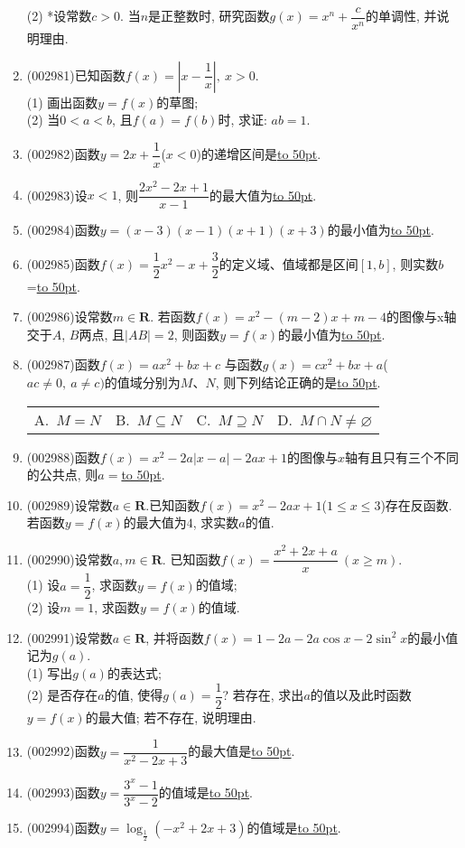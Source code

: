 \documentclass[10pt,a4paper]{article}
\newcommand{\blank}[1]{\underline{\hbox to #1pt{}}}
\newcommand{\fourch}[4]{\par\begin{tabular}{p{.23\textwidth}p{.23\textwidth}p{.23\textwidth}p{.23\textwidth}}
A.~#1 &B.~#2& C.~#3& D.~#4
\end{tabular}}
\begin{document}
\begin{enumerate}[1.]
(2) *设常数$c>0$. 当$n$是正整数时, 研究函数$g(x)=x^n+\dfrac c{x^n}$的单调性, 并说明理由.
\item {\tiny (002981)}已知函数$f(x)=|x-\dfrac 1x|, \ x>0$.\\
(1)	画出函数$y=f(x)$的草图;\\
(2) 当$0<a<b$, 且$f(a)=f(b)$时, 求证: $ab=1$.
\item {\tiny (002982)}函数$y=2x+\dfrac 1x$($x<0$)的递增区间是\blank{50}.
\item {\tiny (002983)}设$x<1$, 则$\dfrac{2x^2-2x+1}{x-1}$的最大值为\blank{50}.
\item {\tiny (002984)}函数$y=(x-3)(x-1)(x+1)(x+3)$的最小值为\blank{50}.
\item {\tiny (002985)}函数$f(x)=\dfrac 12x^2-x+\dfrac 32$的定义域、值域都是区间$[1,b]$, 则实数$b$=\blank{50}.
\item {\tiny (002986)}设常数$m\in \mathbf{R}$. 若函数$f(x)=x^2-(m-2)x+m-4$的图像与x轴交于$A$, $B$两点, 且$|AB|=2$, 则函数$y=f(x)$的最小值为\blank{50}.
\item {\tiny (002987)}函数$f(x)=ax^2+bx+c$ 与函数$g(x)=cx^2+bx+a$($ac\ne 0,\ a\ne c)$的值域分别为$M$、$N$, 则下列结论正确的是\blank{50}.
\fourch{$M=N$}{$M\subseteq N$}{$M\supseteq N$}{$M\cap N\ne \varnothing$}
\item {\tiny (002988)}函数$f(x)=x^2-2a|x-a|-2ax+1$的图像与$x$轴有且只有三个不同的公共点, 则$a=$\blank{50}.
\item {\tiny (002989)}设常数$a\in \mathbf{R}$.已知函数$f(x)=x^2-2ax+1$($1\le x\le 3$)存在反函数. 若函数$y=f(x)$的最大值为$4$, 求实数$a$的值.
\item {\tiny (002990)}设常数$a,m\in \mathbf{R}$. 已知函数$f(x)=\dfrac{x^2+2x+a}x\  (x\ge m)$.\\
(1) 设$a=\dfrac 12$, 求函数$y=f(x)$的值域;\\
(2) 设$m=1$, 求函数$y=f(x)$的值域.
\item {\tiny (002991)}设常数$a\in \mathbf{R}$, 并将函数$f(x)=1-2a-2a\cos x-2\sin^2 x$的最小值记为$g(a)$.\\
(1) 写出$g(a)$的表达式;\\
(2) 是否存在$a$的值, 使得$g(a)=\dfrac 12$? 若存在, 求出$a$的值以及此时函数$y=f(x)$的最大值; 若不存在, 说明理由.
\item {\tiny (002992)}函数$y=\dfrac 1{x^2-2x+3}$的最大值是\blank{50}.
\item {\tiny (002993)}函数$y=\dfrac{3^x-1}{3^x-2}$的值域是\blank{50}.
\item {\tiny (002994)}函数$y=\log_{\frac 12}(-x^2+2x+3)$的值域是\blank{50}.

\end{enumerate}
\end{document}

